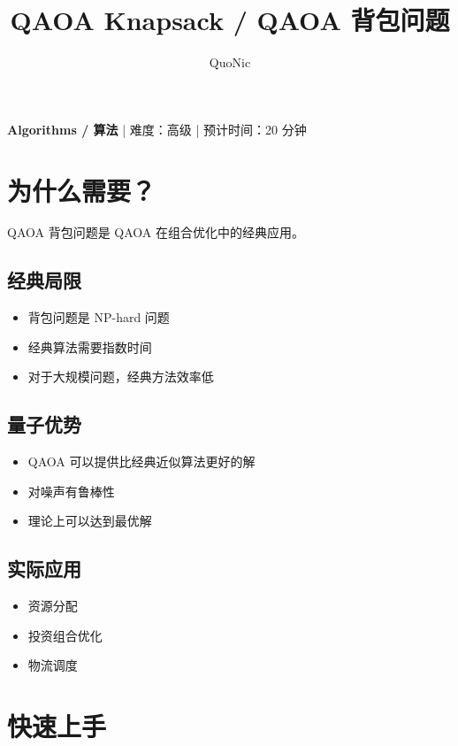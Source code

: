 \documentclass[12pt,a4paper]{article}
\title{QAOA Knapsack / QAOA 背包问题}
\author{QuoNic}
\date{}
\begin{document}
\maketitle

\begin{center}
\textbf{Algorithms / 算法} | 难度：高级 | 预计时间：20 分钟
\end{center}

\tableofcontents
\newpage

\section{为什么需要？}

QAOA 背包问题是 QAOA 在组合优化中的经典应用。

\subsection{经典局限}
\begin{itemize}
  \item 背包问题是 NP-hard 问题
  \item 经典算法需要指数时间
  \item 对于大规模问题，经典方法效率低
\end{itemize}

\subsection{量子优势}
\begin{itemize}
  \item QAOA 可以提供比经典近似算法更好的解
  \item 对噪声有鲁棒性
  \item 理论上可以达到最优解
\end{itemize}

\subsection{实际应用}
\begin{itemize}
  \item 资源分配
  \item 投资组合优化
  \item 物流调度
\end{itemize}

\section{快速上手}
\end{document}
